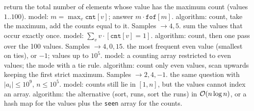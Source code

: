 \begin{variantsbox}
  {return the total number of elements whose value has the maximum count (values $1..100$).}
  {model: $m = \max_v \texttt{cnt}[v]$; answer $m \cdot \texttt{fof}[m]$.}
  {algorithm: count, take the maximum, add the counts equal to it. Samples $\to 4, 5$.}
  {sum the values that occur exactly once.}
  {model: $\sum_v v \cdot [\texttt{cnt}[v] = 1]$.}
  {algorithm: count, then one pass over the 100 values. Samples $\to 4, 0, 15$.}
  {the most frequent even value (smallest on ties), or $-1$; values up to $10^5$.}
  {model: a counting array restricted to even values; the mode with a tie rule.}
  {algorithm: count only even values, scan upwards keeping the first strict maximum. Samples $\to 2, 4, -1$.}
  {the same question with $|a_i| \le 10^9$, $n \le 10^5$.}
  {model: counts still lie in $[1, n]$, but the values cannot index an array.}
  {algorithm: the alternative (sort, runs, sort the runs) in $\mathcal{O}(n \log n)$, or a hash map for the values plus the \texttt{seen} array for the counts.}
\end{variantsbox}
